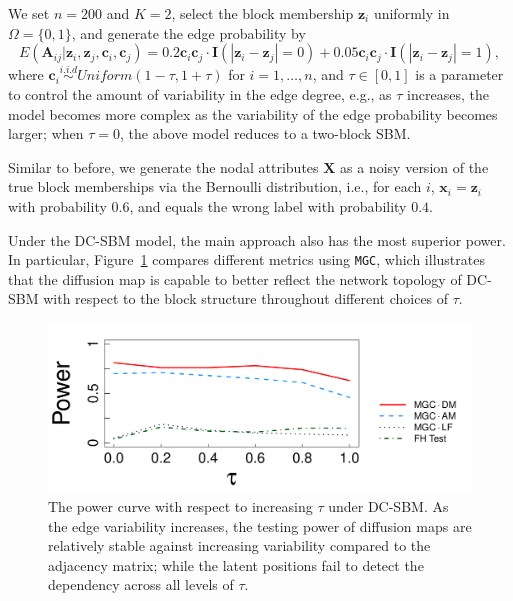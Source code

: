 \documentclass[11pt]{article}
\theoremstyle{definition}
\begin{document}
We set $n=200$ and $K=2$, select the block membership $\mathbf{z}_i$ uniformly in $\Omega=\{0,1\}$, and generate the edge probability by  
\vspace*{-0.4cm}
\begin{equation}
E( \mathbf{A}_{ij} | \mathbf{z}_{i}, \mathbf{z}_{j},\mathbf{c}_{i},\mathbf{c}_{j} )  = 0.2 \mathbf{c}_{i} \mathbf{c}_{j} \cdot \mathbf{I}( |\mathbf{z}_{i} - \mathbf{z}_{j}| = 0 ) + 0.05 \mathbf{c}_{i} \mathbf{c}_{j} \cdot \mathbf{I}(|\mathbf{z}_{i} - \mathbf{z}_{j}| = 1),
\label{eq:tau}
\end{equation} 
where $\mathbf{c}_{i} \overset{i.i.d}{\sim} Uniform(1 - \tau, 1 + \tau)$ for $i = 1, \ldots, n$, and $\tau \in [0, 1]$ is a parameter to control the amount of variability in the edge degree, e.g., as $\tau$ increases, the model becomes more complex as the variability of the edge probability becomes larger; when $\tau=0$, the above model reduces to a two-block SBM. 

Similar to before, we generate the nodal attributes $\mathbf{X}$ as a noisy version of the true block memberships via the Bernoulli distribution, i.e., for each $i$, $\mathbf{x}_{i}= \mathbf{z}_{i}$ with probability $0.6$, and equals the wrong label with probability $0.4$.

Under the DC-SBM model, the main approach also has the most superior power. In particular, Figure~\ref{fig:tau} compares different metrics using \texttt{MGC}, which illustrates that the diffusion map is capable to better reflect the network topology of DC-SBM with respect to the block structure throughout different choices of $\tau$.

\begin{figure}[ht]
	\centering
	\includegraphics[width=0.7\linewidth]{../Figure/elbow3_dcSBM.pdf}
	\caption{The power curve with respect to increasing $\tau$ under DC-SBM. As the edge variability increases, the testing power of diffusion maps are relatively stable against increasing variability compared to the adjacency matrix; while the latent positions fail to detect the dependency across all levels of $\tau$.} 
	\label{fig:tau}
\end{figure}
\end{document}
